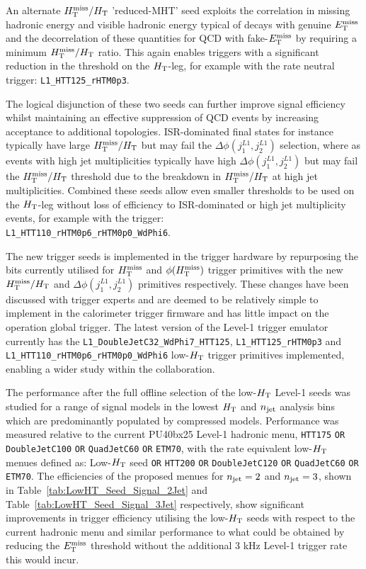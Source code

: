 An alternate $\mbox{$H_{\rm T}^{\rm miss}$}/\mbox{$H_\text{T}$}$ 'reduced-MHT' seed exploits the correlation in missing hadronic energy and visible hadronic energy typical of decays with genuine $\mbox{$E_\text{T}^{\rm miss}$}$ and the decorrelation of these quantities for QCD with fake-$\mbox{$E_\text{T}^{\rm miss}$}$ by requiring a minimum $\mbox{$H_{\rm T}^{\rm miss}$}/\mbox{$H_\text{T}$}$ ratio. This again enables triggers with a significant reduction in the threshold on the $\mbox{$H_\text{T}$}$-leg, for example with the rate neutral trigger: \verb!L1_HTT125_rHTM0p3!.

The logical disjunction of these two seeds can further improve signal efficiency whilst maintaining an effective suppression of QCD events by increasing acceptance to additional topologies. ISR-dominated final states for instance typically have large $\mbox{$H_{\rm T}^{\rm miss}$}/\mbox{$H_\text{T}$}$ but may fail the $\Delta\phi(j_{1}^{L1},j_{2}^{L1})$ selection, where as events with high jet multiplicities typically have high $\Delta\phi(j_{1}^{L1},j_{2}^{L1})$ but may fail the $\mbox{$H_{\rm T}^{\rm miss}$}/\mbox{$H_\text{T}$}$ threshold due to the breakdown in $\mbox{$H_{\rm T}^{\rm miss}$}/\mbox{$H_\text{T}$}$ at high jet multiplicities. Combined these seeds allow even smaller thresholds to be used on the $\mbox{$H_\text{T}$}$-leg without loss of efficiency to ISR-dominated or high jet multiplicity events, for example with the trigger:\\ \verb!L1_HTT110_rHTM0p6_rHTM0p0_WdPhi6!.

The new trigger seeds is implemented in the trigger hardware by repurposing the bits currently utilised for $\mbox{$H_{\rm T}^{\rm miss}$}$ and $\phi({\mbox{$H_{\rm T}^{\rm miss}$}})$ trigger primitives with the new $\mbox{$H_{\rm T}^{\rm miss}$}/\mbox{$H_\text{T}$}$ and $\Delta\phi(j_{1}^{L1},j_{2}^{L1})$ primitives respectively. These changes have been discussed with trigger experts and are deemed to be relatively simple to implement in the calorimeter trigger firmware and has little impact on the operation global trigger. The latest version of the Level-1 trigger emulator currently has the \verb!L1_DoubleJetC32_WdPhi7_HTT125!, \verb!L1_HTT125_rHTM0p3! and \\ \verb!L1_HTT110_rHTM0p6_rHTM0p0_WdPhi6! low-$\mbox{$H_\text{T}$}$ trigger primitives implemented, enabling a wider study within the collaboration.

The performance after the full offline selection of the low-$\mbox{$H_\text{T}$}$ Level-1 seeds was studied for a range of signal models in the lowest $\mbox{$H_\text{T}$}$ and $n_{\text{jet}}$ analysis bins which are predominantly populated by compressed models. Performance was measured relative to the current PU40bx25 Level-1 hadronic menu, {\verb!HTT175! \verb!OR! \verb!DoubleJetC100! \verb!OR! \verb!QuadJetC60! \verb!OR! \verb!ETM70!}, with the rate equivalent low-$\mbox{$H_\text{T}$}$ menues defined as: Low-$\mbox{$H_\text{T}$}$ seed {\verb!OR! \verb!HTT200! \verb!OR! \verb!DoubleJetC120! \verb!OR! \verb!QuadJetC60! \verb!OR! \verb!ETM70!}. The efficiencies of the proposed menues for $n_{\text{jet}} = 2$ and $n_{\text{jet}} = 3$, shown in Table~\ref{tab:LowHT_Seed_Signal_2Jet} and Table~\ref{tab:LowHT_Seed_Signal_3Jet} respectively, show significant improvements in trigger efficiency utilising the low-$\mbox{$H_\text{T}$}$ seeds with respect to the current hadronic menu and similar performance to what could be obtained by reducing the $\mbox{$E_\text{T}^{\rm miss}$}$ threshold without the additional 3 kHz Level-1 trigger rate this would incur.

